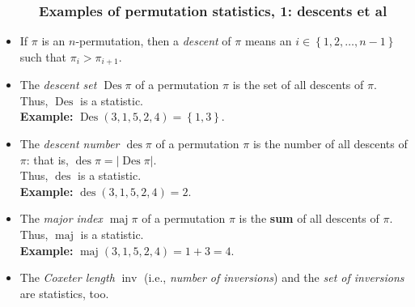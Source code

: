\documentclass{beamer}
\newcommand{\Des}{\operatorname{Des}}
\newcommand{\des}{\operatorname{des}}
\newcommand{\maj}{\operatorname{maj}}
\newcommand{\fti}[1]{\frametitle{\ \ \ \ \ #1}}
\newcommand{\set}[1]{\left\{ #1 \right\}}
\newcommand{\abs}[1]{\left| #1 \right|}
\newcommand{\tup}[1]{\left( #1 \right)}
\newcommand{\defn}[1]{{\color{darkred}\emph{#1}}} %
\theoremstyle{plain}
\begin{document}
\begin{frame}
\fti{Examples of permutation statistics, 1: descents et al}

\begin{itemize}

\item If $\pi$ is an $n$-permutation, then a \defn{descent} of $\pi$
      means an $i \in \set{1, 2, \ldots, n-1}$ such that
      $\pi_i > \pi_{i+1}$.

\pause

\item The \defn{descent set $\Des \pi$} of a permutation $\pi$ is
      the set of all descents of $\pi$. \\
      Thus, \defn{$\Des$} is a statistic. \\
      \textbf{Example:} $\Des \tup{3, 1, 5, 2, 4} = \set{1, 3}$.

\pause

\item The \defn{descent number $\des \pi$} of a permutation $\pi$
      is the number of all descents of $\pi$: that is,
      $\des \pi = \abs{\Des \pi}$. \\
      Thus, \defn{$\des$} is a statistic. \\
      \textbf{Example:} $\des \tup{3, 1, 5, 2, 4} = 2$.

\pause

\item The \defn{major index $\maj \pi$} of a permutation $\pi$
      is the \textbf{sum} of all descents of $\pi$. \\
      Thus, \defn{$\maj$} is a statistic. \\
      \textbf{Example:} $\maj \tup{3, 1, 5, 2, 4} = 1 + 3 = 4$.

\pause

\item The \defn{Coxeter length} $\operatorname{inv}$
      (i.e., \defn{number of inversions})
      and the \defn{set of inversions} are statistics, too.

\end{itemize}
\end{frame}
\end{document}
